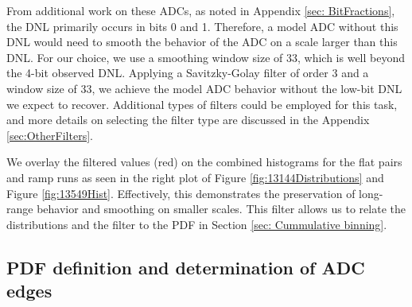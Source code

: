 \documentclass[linenumbers]{aastex7}
\begin{document}
From additional work on these ADCs, as noted in Appendix \ref{sec: BitFractions}, the DNL primarily occurs in bits 0 and 1. 
Therefore, a model ADC without this DNL would need to smooth the behavior of the ADC on a scale larger than this DNL.
For our choice, we use a smoothing window size of 33, which is well beyond the 4-bit observed DNL. 
Applying  a Savitzky-Golay filter of order 3 and a window size of 33, we achieve the model ADC behavior without the low-bit DNL we expect to recover. 
Additional types of filters could be employed for this task, and more details on selecting the filter type are discussed in the Appendix
\ref{sec:OtherFilters}. 

We overlay the filtered values (red) on the combined histograms for the flat pairs and ramp runs as seen in the right plot of Figure \ref{fig:13144Distributions} and Figure \ref{fig:13549Hist}.
Effectively, this demonstrates the preservation of long-range behavior and smoothing on smaller scales. 
This filter allows us to relate the distributions and the filter to the PDF in Section \ref{sec: Cummulative binning}. 

\subsection{PDF definition and determination of ADC edges}
\label{sec:PDFEdges}
\end{document}
